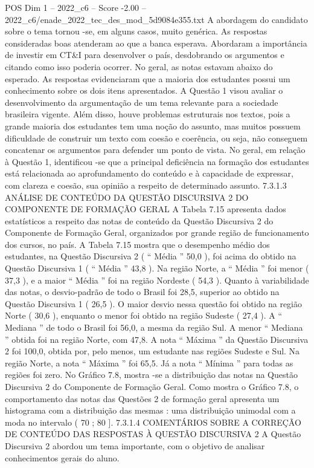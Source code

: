 \begin{textsample}{POS Dim 1 – 2022\_c6 – Score -2.00 – 2022\_c6/enade\_2022\_tec\_des\_mod\_5d9084e355.txt}
A abordagem do candidato sobre o tema tornou -se, em alguns casos, muito genérica.
As respostas consideradas boas atenderam ao que a banca esperava.
Abordaram a importância de investir em CT\&I para desenvolver o país, desdobrando os argumentos e citando como isso poderia ocorrer.
No geral, as notas estavam abaixo do esperado.
As respostas evidenciaram que a maioria dos estudantes possui um conhecimento sobre os dois itens apresentados.
A Questão 1 visou avaliar o desenvolvimento da argumentação de um tema relevante para a sociedade brasileira vigente.
Além disso, houve problemas estruturais nos textos, pois a grande maioria dos estudantes tem uma noção do assunto, mas muitos possuem dificuldade de construir um texto com coesão e coerência, ou seja, não conseguem concatenar os argumentos para defender um ponto de vista.
No geral, em relação à Questão 1, identificou -se que a principal deficiência na formação dos estudantes está relacionada ao aprofundamento do conteúdo e à capacidade de expressar, com clareza e coesão, sua opinião a respeito de determinado assunto. 7.3.1.3 ANÁLISE DE CONTEÚDO DA QUESTÃO DISCURSIVA 2 DO COMPONENTE DE FORMAÇÃO GERAL A Tabela 7.15 apresenta dados estatísticos a respeito das notas de conteúdo da Questão Discursiva 2 do Componente de Formação Geral, organizados por grande região de funcionamento dos cursos, no país.
A Tabela 7.15 mostra que o desempenho médio dos estudantes, na Questão Discursiva 2 ( “ Média ” 50,0 ), foi acima do obtido na Questão Discursiva 1 ( “ Média ” 43,8 ).
Na região Norte, a “ Média ” foi menor ( 37,3 ), e a maior “ Média ” foi na região Nordeste ( 54,3 ).
Quanto à variabilidade das notas, o desvio-padrão de todo o Brasil foi 28,5, superior ao obtido na Questão Discursiva 1 ( 26,5 ).
O maior desvio nessa questão foi obtido na região Norte ( 30,6 ), enquanto o menor foi obtido na região Sudeste ( 27,4 ).
A “ Mediana ” de todo o Brasil foi 56,0, a mesma da região Sul.
A menor “ Mediana ” obtida foi na região Norte, com 47,8.
A nota “ Máxima ” da Questão Discursiva 2 foi 100,0, obtida por, pelo menos, um estudante nas regiões Sudeste e Sul.
Na região Norte, a nota “ Máxima ” foi 65,5.
Já a nota “ Mínima ” para todas as regiões foi zero.
No Gráfico 7.8, mostra -se a distribuição das notas na Questão Discursiva 2 do Componente de Formação Geral.
Como mostra o Gráfico 7.8, o comportamento das notas das Questões 2 de formação geral apresenta um histograma com a distribuição das mesmas : uma distribuição unimodal com a moda no intervalo ( 70 ; 80 ]. 7.3.1.4 COMENTÁRIOS SOBRE A CORREÇÃO DE CONTEÚDO DAS RESPOSTAS À QUESTÃO DISCURSIVA 2 A Questão Discursiva 2 abordou um tema importante, com o objetivo de analisar conhecimentos gerais do aluno.

\end{textsample}
